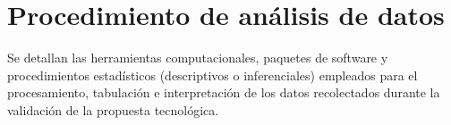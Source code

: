 \section{Procedimiento de análisis de datos}
\label{sec:analisis_datos}

Se detallan las herramientas computacionales, paquetes de software y procedimientos estadísticos (descriptivos o inferenciales) empleados para el procesamiento, tabulación e interpretación de los datos recolectados durante la validación de la propuesta tecnológica.
